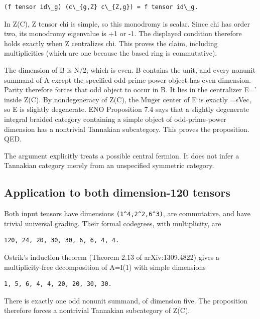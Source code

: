 \begin{verbatim}
(f tensor id\_g) (c\_{g,Z} c\_{Z,g}) = f tensor id\_g.
\end{verbatim}

In Z(C), Z tensor chi is simple, so this monodromy is scalar. Since chi
has order two, its monodromy eigenvalue is +1 or -1. The displayed
condition therefore holds exactly when Z centralizes chi. This proves
the claim, including multiplicities (which are one because the based
ring is commutative).

The dimension of B is N/2, which is even. B contains the unit, and every
nonunit summand of A except the specified odd-prime-power object has
even dimension. Parity therefore forces that odd object to occur in B.
It lies in the centralizer E=' inside Z(C). By nondegeneracy of Z(C),
the Muger center of E is exactly =sVec, so E is slightly degenerate. ENO
Proposition 7.4 says that a slightly degenerate integral braided
category containing a simple object of odd-prime-power dimension has a
nontrivial Tannakian subcategory. This proves the proposition. QED.

The argument explicitly treats a possible central fermion. It does not
infer a Tannakian category merely from an unspecified symmetric
category.

\hypertarget{application-to-both-dimension-120-tensors}{%
\subsection{Application to both dimension-120
tensors}\label{application-to-both-dimension-120-tensors}}

Both input tensors have dimensions
\texttt{(1\textasciicircum{}4,2\allowbreak{}\textasciicircum{}2,6\textasciicircum{}3\allowbreak{})},
are commutative, and have trivial universal grading. Their formal
codegrees, with multiplicity, are

\begin{verbatim}
120, 24, 20, 30, 30, 6, 6, 4, 4.
\end{verbatim}

Ostrik's induction theorem (Theorem 2.13 of arXiv:1309.4822) gives a
multiplicity-free decomposition of A=I(1) with simple dimensions

\begin{verbatim}
1, 5, 6, 4, 4, 20, 20, 30, 30.
\end{verbatim}

There is exactly one odd nonunit summand, of dimension five. The
proposition therefore forces a nontrivial Tannakian subcategory of Z(C).

